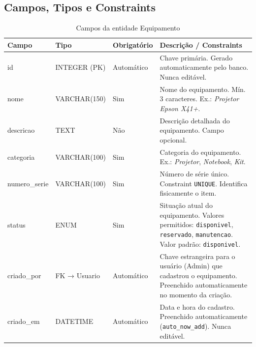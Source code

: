 \documentclass[12pt, a4paper]{article}
\begin{document}
\subsection{Campos, Tipos e Constraints}

\begin{table}[H]
\centering
\small
\begin{tabular}{T{2.8cm} L{3.2cm} L{2.8cm} L{4.6cm}}
  \toprule
  \textbf{Campo} & \textbf{Tipo} & \textbf{Obrigatório} & \textbf{Descrição / Constraints} \\
  \midrule

  id
    & INTEGER (PK)
    & Automático
    & Chave primária. Gerado automaticamente pelo banco. Nunca editável. \\
  \addlinespace

  nome
    & VARCHAR(150)
    & Sim
    & Nome do equipamento. Mín. 3 caracteres. Ex.: \textit{Projetor Epson X41+}. \\
  \addlinespace

  descricao
    & TEXT
    & Não
    & Descrição detalhada do equipamento. Campo opcional. \\
  \addlinespace

  categoria
    & VARCHAR(100)
    & Sim
    & Categoria do equipamento. Ex.: \textit{Projetor}, \textit{Notebook}, \textit{Kit}. \\
  \addlinespace

  numero\_serie
    & VARCHAR(100)
    & Sim
    & Número de série único. Constraint \texttt{UNIQUE}. Identifica fisicamente o item. \\
  \addlinespace

  status
    & ENUM
    & Sim
    & Situação atual do equipamento. Valores permitidos: \texttt{disponivel}, \texttt{reservado}, \texttt{manutencao}. Valor padrão: \texttt{disponivel}. \\
  \addlinespace

  criado\_por
    & FK → Usuario
    & Automático
    & Chave estrangeira para o usuário (Admin) que cadastrou o equipamento. Preenchido automaticamente no momento da criação. \\
  \addlinespace

  criado\_em
    & DATETIME
    & Automático
    & Data e hora do cadastro. Preenchido automaticamente (\texttt{auto\_now\_add}). Nunca editável. \\

  \bottomrule
\end{tabular}
\caption{Campos da entidade Equipamento}
\end{table}
\end{document}
